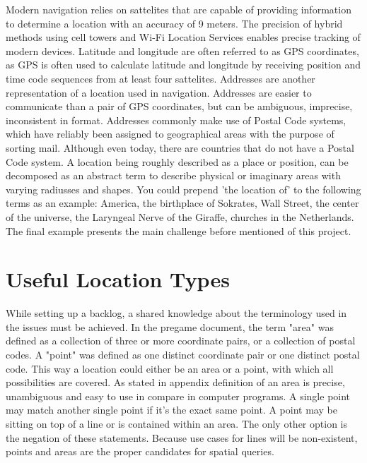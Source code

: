 Modern navigation relies on sattelites that are capable of providing information to determine a location with an accuracy of 9 meters. The precision of hybrid methods using cell towers and Wi-Fi Location Services enables precise tracking of modern devices. Latitude and longitude are often referred to as GPS coordinates, as GPS is often used to calculate latitude and longitude by receiving position and time code sequences from at least four sattelites. Addresses are another representation of a location used in navigation. Addresses are easier to communicate than a pair of GPS coordinates, but can be ambiguous, imprecise, inconsistent in format. Addresses commonly make use of Postal Code systems, which have reliably been assigned to geographical areas with the purpose of sorting mail. Although even today, there are countries that do not have a Postal Code system.
A location being roughly described as a place or position, can be decomposed as an abstract term to describe physical or imaginary areas with varying radiusses and shapes. You could prepend 'the location of' to the following terms as an example: America, the birthplace of Sokrates, Wall Street, the center of the universe, the Laryngeal Nerve of the Giraffe, churches in the Netherlands. The final example presents the main challenge before mentioned of this project.

%
\section{Useful Location Types}
While setting up a backlog, a shared knowledge about the terminology used in the issues must be achieved. In the pregame document, the term "area" was defined as a collection of three or more coordinate pairs, or a collection of postal codes. A "point" was defined as one distinct coordinate pair or one distinct postal code. This way a location could either be an area or a point, with which all possibilities are covered. As stated in appendix  definition of an area is precise, unambiguous and easy to use in compare in computer programs. A single point may match another single point if it’s the exact same point. A point may be sitting on top of a line or is contained within an area. The only other option is the negation of these statements. Because use cases for lines will be non-existent, points and areas are the proper candidates for spatial queries.

